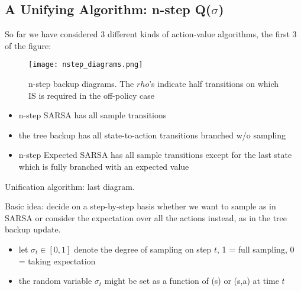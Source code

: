 \documentclass[sutton_barto_notes.tex]{subfiles}
\begin{document}
\newpage
\subsection{A Unifying Algorithm: n-step Q($\sigma$)}

So far we have considered 3 different kinds of action-value algorithms, the first 3 of the figure:
\begin{figure}[h!]
    \centering
     \texttt{[image: nstep\_diagrams.png]}
    \caption{ n-step backup diagrams. The $rho$'s indicate half transitions on which IS is required in the off-policy case }
\end{figure}
\begin{itemize}
\item n-step SARSA has all sample transitions
\item the tree backup has all state-to-action transitions branched w/o sampling
\item n-step Expected SARSA has all sample transitions except for the last state which is fully branched with an expected value
\end{itemize}

Unification algorithm: last diagram.

Basic idea: decide on a step-by-step basis whether we want to sample as in SARSA or consider the expectation over all the actions instead, as in the tree backup update.

\begin{itemize}
\item let $\sigma_t \in [0,1]$ denote the degree of sampling on step $t$, 1 = full sampling, 0 = taking expectation
\item the random variable $\sigma_t$ might be set as a function of (s) or (s,a) at time $t$
\end{itemize}
\end{document}
